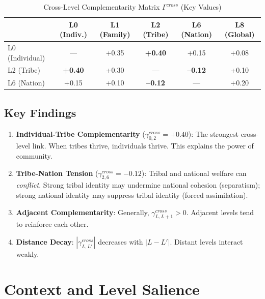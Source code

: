 \documentclass[12pt,a4paper]{article}
\begin{document}
\begin{table}[htbp]
\centering
\caption{Cross-Level Complementarity Matrix $\Gamma^{cross}$ (Key Values)}
\label{tab:gamma-cross}
\renewcommand{\arraystretch}{1.3}
\begin{tabular}{@{}lccccc@{}}
\toprule
& L0 (Indiv.) & L1 (Family) & L2 (Tribe) & L6 (Nation) & L8 (Global) \\
\midrule
L0 (Individual) & --- & +0.35 & \textbf{+0.40} & +0.15 & +0.08 \\
L2 (Tribe) & \textbf{+0.40} & +0.30 & --- & \textbf{--0.12} & +0.10 \\
L6 (Nation) & +0.15 & +0.10 & \textbf{--0.12} & --- & +0.20 \\
\bottomrule
\end{tabular}
\end{table}

\subsection{Key Findings}

\begin{enumerate}[nosep]
\item \textbf{Individual-Tribe Complementarity} ($\gamma^{cross}_{0,2} = +0.40$): 
The strongest cross-level link. When tribes thrive, individuals thrive. 
This explains the power of community.

\item \textbf{Tribe-Nation Tension} ($\gamma^{cross}_{2,6} = -0.12$): 
Tribal and national welfare can \textit{conflict}. Strong tribal identity 
may undermine national cohesion (separatism); strong national identity 
may suppress tribal identity (forced assimilation).

\item \textbf{Adjacent Complementarity}: Generally, $\gamma^{cross}_{L,L+1} > 0$. 
Adjacent levels tend to reinforce each other.

\item \textbf{Distance Decay}: $|\gamma^{cross}_{L,L'}|$ decreases with $|L - L'|$. 
Distant levels interact weakly.
\end{enumerate}

\section{Context and Level Salience}
\label{sec:context}
\end{document}
